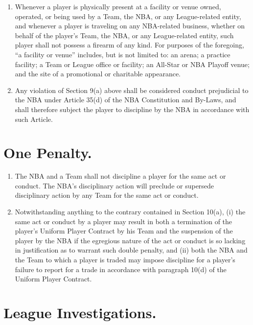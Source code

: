 \documentclass[
]{book}
\providecommand{\tightlist}{%
  \setlength{\itemsep}{0pt}\setlength{\parskip}{0pt}}
\begin{document}
\begin{enumerate}
\def\labelenumi{(\alph{enumi})}
\tightlist
\item
  Whenever a player is physically present at a facility or venue owned, operated, or being used by a Team, the NBA, or any League-related entity, and whenever a player is traveling on any NBA-related business, whether on behalf of the player's Team, the NBA, or any League-related entity, such player shall not possess a firearm of any kind. For purposes of the foregoing, ``a facility or venue'' includes, but is not limited to: an arena; a practice facility; a Team or League office or facility; an All-Star or NBA Playoff venue; and the site of a promotional or charitable appearance.
\item
  Any violation of Section 9(a) above shall be considered conduct prejudicial to the NBA under Article 35(d) of the NBA Constitution and By-Laws, and shall therefore subject the player to discipline by the NBA in accordance with such Article.
\end{enumerate}

\hypertarget{one-penalty.}{%
\section{One Penalty.}\label{one-penalty.}}

\begin{enumerate}
\def\labelenumi{(\alph{enumi})}
\tightlist
\item
  The NBA and a Team shall not discipline a player for the same act or conduct. The NBA's disciplinary action will preclude or supersede disciplinary action by any Team for the same act or conduct.
\item
  Notwithstanding anything to the contrary contained in Section 10(a), (i) the same act or conduct by a player may result in both a termination of the player's Uniform Player Contract by his Team and the suspension of the player by the NBA if the egregious nature of the act or conduct is so lacking in justification as to warrant such double penalty, and (ii) both the NBA and the Team to which a player is traded may impose discipline for a player's failure to report for a trade in accordance with paragraph 10(d) of the Uniform Player Contract.
\end{enumerate}

\hypertarget{league-investigations.}{%
\section{League Investigations.}\label{league-investigations.}}
\end{document}
